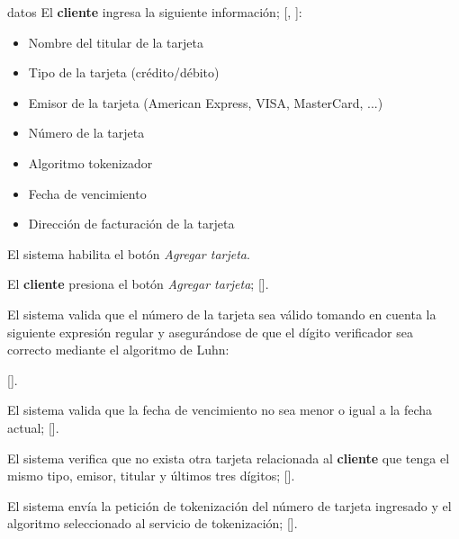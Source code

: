 {\begin{trayectoriaPrincipal}
    \item[datos] El \textbf{cliente} ingresa la siguiente información;
      [,
      ]:
      \begin{itemize}
        \item Nombre del titular de la tarjeta
        \item Tipo de la tarjeta (crédito/débito)
        \item Emisor de la tarjeta (American Express, VISA, MasterCard, ...)
        \item Número de la tarjeta
        \item Algoritmo tokenizador
        \item Fecha de vencimiento
        \item Dirección de facturación de la tarjeta
      \end{itemize}

    \item El sistema habilita el botón \textit{Agregar tarjeta}.

    \item El \textbf{cliente} presiona el botón \textit{Agregar tarjeta};
      [].

    \item El sistema valida que el número de la tarjeta sea válido tomando en
      cuenta la siguiente expresión regular y asegurándose de que el dígito
      verificador sea correcto mediante el algoritmo de Luhn:


      [].

    \item El sistema valida que la fecha de vencimiento no sea menor o igual a
      la fecha actual; [].

    \item El sistema verifica que no exista otra tarjeta relacionada al
      \textbf{cliente} que tenga el mismo tipo, emisor, titular y últimos tres
      dígitos; [].

    \item El sistema envía la petición de tokenización del número de tarjeta
      ingresado y el algoritmo seleccionado al servicio de tokenización;
      [].


\end{trayectoriaPrincipal}}
